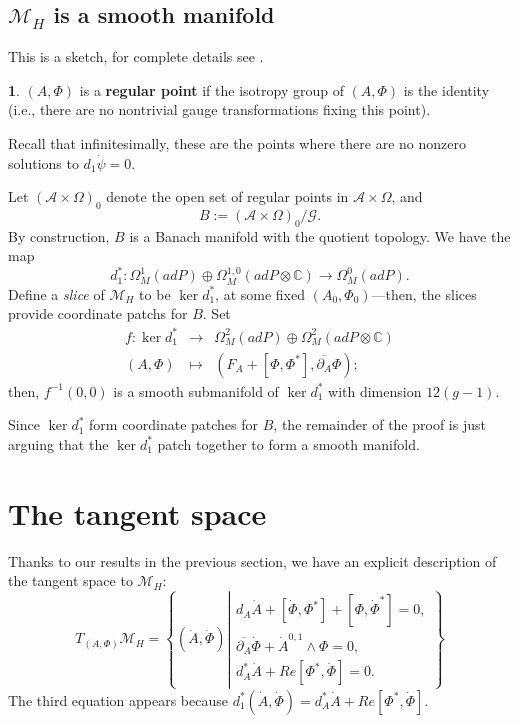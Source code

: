 \documentclass[oneside,english]{amsbook}
\numberwithin{section}{chapter}
\numberwithin{equation}{section}
\numberwithin{figure}{section}
\theoremstyle{plain}
\theoremstyle{definition}
\newtheorem{defn}[thm]{\protect\definitionname}
\theoremstyle{remark}
\theoremstyle{definition}
\theoremstyle{definition}
\theoremstyle{plain}
\providecommand{\definitionname}{Definition}
\begin{document}
\subsection{$\mathcal{M}_{H}$ is a smooth manifold}

This is a sketch, for complete details see \cite{H1}. 
\begin{defn}
$\left(A,\Phi\right)$ is a \textbf{regular point} if the isotropy
group of $\left(A,\Phi\right)$ is the identity (i.e., there are no
nontrivial gauge transformations fixing this point).
\end{defn}
Recall that infinitesimally, these are the points where there are
no nonzero solutions to $d_{1}\dot{\psi}=0$. 

Let $\left(\mathcal{A}\times\Omega\right)_{0}$ denote the open set
of regular points in $\mathcal{A}\times\Omega$, and 
\[
B:=\left(\mathcal{A}\times\Omega\right)_{0}/\mathcal{G}.
\]
By construction, $B$ is a Banach manifold with the quotient topology.
We have the map 
\[
d_{1}^{*}:\Omega_{M}^{1}\left(adP\right)\oplus\Omega_{M}^{1,0}\left(adP\otimes\mathbb{C}\right)\longrightarrow\Omega_{M}^{0}\left(adP\right).
\]
Define a \emph{slice} of $\mathcal{M}_{H}$ to be $\ker d_{1}^{*}$,
at some fixed $\left(A_{0},\Phi_{0}\right)$---then, the slices provide
coordinate patchs for $B$. Set 
\begin{eqnarray*}
f:\ker d_{1}^{*} & \longrightarrow & \Omega_{M}^{2}\left(adP\right)\oplus\Omega_{M}^{2}\left(adP\otimes\mathbb{C}\right)\\
\left(A,\Phi\right) & \mapsto & \left(F_{A}+\left[\Phi,\Phi^{*}\right],\overline{\partial_{A}}\Phi\right);
\end{eqnarray*}
then, $f^{-1}\left(0,0\right)$ is a smooth submanifold of $\ker d_{1}^{*}$
with dimension $12(g-1)$. 

Since $\ker d_{1}^{*}$ form coordinate patches for $B$, the remainder
of the proof is just arguing that the $\ker d_{1}^{*}$ patch together
to form a smooth manifold. 


\section{The tangent space}

Thanks to our results in the previous section, we have an explicit
description of the tangent space to $\mathcal{M}_{H}$: 
\[
T_{\left(A,\Phi\right)}\mathcal{M}_{H}=\left\{ \left(\dot{A},\dot{\Phi}\right)\left|\begin{matrix}d_{A}\dot{A}+\left[\dot{\Phi},\Phi^{*}\right]+\left[\Phi,\dot{\Phi}^{*}\right]=0,\\
\overline{\partial_{A}}\dot{\Phi}+\dot{A}^{0,1}\wedge\Phi=0,\\
d_{A}^{*}\dot{A}+Re\left[\Phi^{*},\dot{\Phi}\right]=0.
\end{matrix}\right.\right\} 
\]
The third equation appears because $d_{1}^{*}\left(\dot{A},\dot{\Phi}\right)=d_{A}^{*}\dot{A}+Re\left[\Phi^{*},\dot{\Phi}\right]$. 
\end{document}
